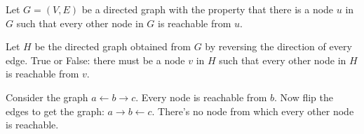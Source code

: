 \Needspace{1.5in}
\begin{prob}

    Let $G = (V, E)$ be a directed graph with the property that there is a node $u$ in $G$
    such that every other node in $G$ is reachable from $u$.

    Let $H $ be the directed graph obtained from $G$ by reversing the direction
    of every edge. True or False: there must be a node $v$ in $H$ such that
    every other node in $H$ is reachable from $v$.

    \tF{}


    \begin{soln}
        Consider the graph $a \leftarrow b \rightarrow c$. Every node is reachable from $b$.
        Now flip the edges to get the graph: $a \rightarrow b \leftarrow c$. There's no
        node from which every other node is reachable.
    \end{soln}

\end{prob}
